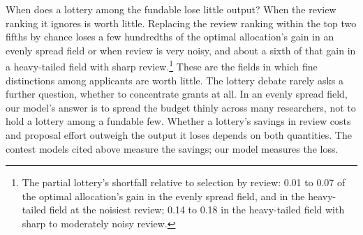 \documentclass[article, 11pt, reqno]{amsart}
\theoremstyle{named}
\begin{document}
When does a lottery among the fundable lose little output? When the review ranking it
ignores is worth little. Replacing the review ranking within the top two fifths by
chance loses a few hundredths of the optimal allocation's gain in an evenly spread
field or when review is very noisy, and about a sixth of that gain in a heavy-tailed
field with sharp review.\footnote{The partial lottery's shortfall relative to
selection by review: 0.01 to 0.07 of the optimal allocation's gain in the evenly
spread field, and in the heavy-tailed field at the noisiest review; 0.14 to 0.18 in
the heavy-tailed field with sharp to moderately noisy review.} These are the fields in
which fine distinctions among applicants are worth little. The lottery debate rarely
asks a further question, whether to concentrate grants at all. In an evenly spread
field, our model's answer is to spread the budget thinly across many researchers, not
to hold a lottery among a fundable few. Whether a lottery's savings in review costs
and proposal effort outweigh the output it loses depends on both quantities. The
contest models cited above measure the savings; our model measures the loss.
\end{document}
